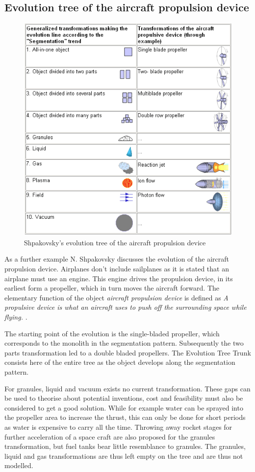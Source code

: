 \documentclass[11pt,a4paper]{article}
\begin{document}
\subsection{Evolution tree of the aircraft propulsion device}

\begin{figure}[htb]
  \centering
  \includegraphics[width=0.75\linewidth]{figures/aircraft.png}
  \caption{\small Shpakovsky's evolution tree of the aircraft propulsion
    device \cite{Shpakovsky2003}}
	\label{fig:aircraft}
\end{figure}

As a further example N. Shpakovsky discusses the evolution of the aircraft
propulsion device. Airplanes don't include sailplanes as it is stated that an
airplane must use an engine. This engine drives the propulsion device, in its
earliest form a propeller, which in turn moves the aircraft forward. The
elementary function of the object \textit{aircraft propulsion device} is
defined as \textit{A propulsive device is what an aircraft uses to push off
  the surrounding space while flying.} \cite{Shpakovsky2003}.

The starting point of the evolution is the single-bladed propeller, which
corresponds to the monolith in the segmentation pattern. Subsequently the two
parts transformation led to a double bladed propellers. The Evolution Tree
Trunk consists here of the entire tree as the object develops along the
segmentation pattern.

For granules, liquid and vacuum exists no current transformation. These gaps
can be used to theorise about potential inventions, cost and feasibility must
also be considered to get a good solution. While for example water can be
sprayed into the propeller area to increase the thrust, this can only be done
for short periods as water is expensive to carry all the time. Throwing away
rocket stages for further acceleration of a space craft are also proposed for
the granules transformation, but fuel tanks bear little resemblance to
granules. The granules, liquid and gas transformations are thus left empty on
the tree and are thus not modelled. 
\end{document}
